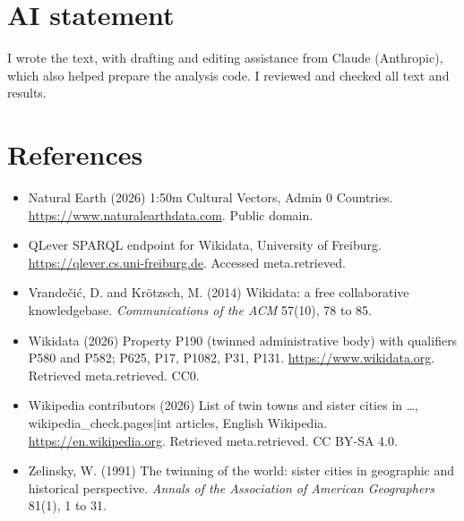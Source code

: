 \documentclass[11pt,a4paper]{article}
\begin{document}
\section*{AI statement}

I wrote the text, with drafting and editing assistance from Claude (Anthropic), which also helped prepare the analysis code. I reviewed and checked all text and results.

\section*{References}
\small
\begin{itemize}\setlength{\itemsep}{2pt}
\item Natural Earth (2026) 1:50m Cultural Vectors, Admin 0 Countries. \url{https://www.naturalearthdata.com}. Public domain.
\item QLever SPARQL endpoint for Wikidata, University of Freiburg. \url{https://qlever.cs.uni-freiburg.de}. Accessed {{meta.retrieved}}.
\item Vrande\v{c}i\'{c}, D. and Kr\"{o}tzsch, M. (2014) Wikidata: a free collaborative knowledgebase. \emph{Communications of the ACM} 57(10), 78 to 85.
\item Wikidata (2026) Property P190 (twinned administrative body) with qualifiers P580 and P582; P625, P17, P1082, P31, P131. \url{https://www.wikidata.org}. Retrieved {{meta.retrieved}}. CC0.
\item Wikipedia contributors (2026) List of twin towns and sister cities in \ldots, {{wikipedia_check.pages|int}} articles, English Wikipedia. \url{https://en.wikipedia.org}. Retrieved {{meta.retrieved}}. CC BY-SA 4.0.
\item Zelinsky, W. (1991) The twinning of the world: sister cities in geographic and historical perspective. \emph{Annals of the Association of American Geographers} 81(1), 1 to 31.
\end{itemize}
\end{document}
